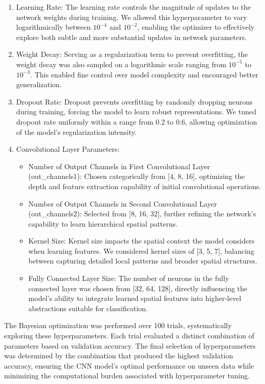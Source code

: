\documentclass[
]{krantz}
\providecommand{\tightlist}{%
  \setlength{\itemsep}{0pt}\setlength{\parskip}{0pt}}
\begin{document}
\begin{enumerate}
\def\labelenumi{\arabic{enumi}.}
\tightlist
\item
  Learning Rate:
  The learning rate controls the magnitude of updates to the network weights during training. We allowed this hyperparameter to vary logarithmically between \(10^{-4}\) and \(10^{-2}\), enabling the optimizer to effectively explore both subtle and more substantial updates in network parameters.
\item
  Weight Decay:
  Serving as a regularization term to prevent overfitting, the weight decay was also sampled on a logarithmic scale ranging from \(10^{-5}\) to \(10^{-3}\). This enabled fine control over model complexity and encouraged better generalization.
\item
  Dropout Rate:
  Dropout prevents overfitting by randomly dropping neurons during training, forcing the model to learn robust representations. We tuned dropout rate uniformly within a range from 0.2 to 0.6, allowing optimization of the model's regularization intensity.
\item
  Convolutional Layer Parameters:

  \begin{itemize}
  \tightlist
  \item
    Number of Output Channels in First Convolutional Layer (out\_channels1):
    Chosen categorically from {[}4, 8, 16{]}, optimizing the depth and feature extraction capability of initial convolutional operations.
  \item
    Number of Output Channels in Second Convolutional Layer (out\_channels2):
    Selected from {[}8, 16, 32{]}, further refining the network's capability to learn hierarchical spatial patterns.
  \item
    Kernel Size:
    Kernel size impacts the spatial context the model considers when learning features. We considered kernel sizes of {[}3, 5, 7{]}, balancing between capturing detailed local patterns and broader spatial structures.
  \item
    Fully Connected Layer Size:
    The number of neurons in the fully connected layer was chosen from {[}32, 64, 128{]}, directly influencing the model's ability to integrate learned spatial features into higher-level abstractions suitable for classification.
  \end{itemize}
\end{enumerate}

The Bayesian optimization was performed over 100 trials, systematically exploring these hyperparameters.
Each trial evaluated a distinct combination of parameters based on validation accuracy.
The final selection of hyperparameters was determined by the combination that produced the highest validation accuracy,
ensuring the CNN model's optimal performance on unseen data while minimizing the computational burden associated with hyperparameter tuning.
\end{document}
